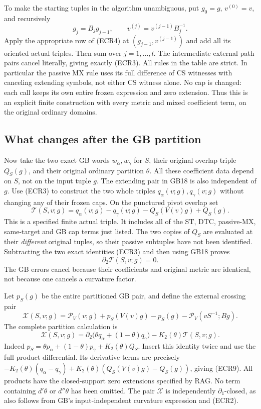 To make the starting tuples in the algorithm unambiguous, put
$g_0=g$, $v^{(0)}=v$, and recursively
\[
        g_j=B_jg_{j-1},\qquad
        v^{(j)}=v^{(j-1)}B_j^{-1}.
 \tag{ECR6}
\]
Apply the appropriate row of (ECR4) at $(g_{j-1},v^{(j-1)})$
and add all its oriented actual triples.  Then sum over
$j=1,\ldots,l$.  The intermediate external path pairs cancel
literally, giving exactly (ECR3).  All rules in the table are
strict.  In particular the passive MX rule uses its full
difference of CS witnesses with canceling extending symbols,
not either CS witness alone.  No cap is changed: each call keeps
its own entire frozen expression and zero extension.  Thus this
is an explicit finite construction with every metric and mixed
coefficient term, on the original ordinary domains.

\subsection{What changes after the GB partition}

Now take the two exact GB words $w_\alpha,w_\gamma$ for $S$,
their original overlap triple $Q_S(g)$, and their original
ordinary partition $\theta$.  All these coefficient data depend
on $S$, not on the input tuple $g$.  The extending pair in GB18
is also independent of $g$.  Use (ECR3) to construct the two
whole triples $q_\alpha(v;g),q_\gamma(v;g)$ without changing
any of their frozen caps.  On the punctured pivot overlap set
\[
 \mathcal T(S,v;g)=q_\alpha(v;g)-q_\gamma(v;g)
                        -Q_S(V(v)g)+Q_S(g).
 \tag{ECR7}
\]
This is a specified finite actual triple.  It includes all of
the ST, DTC, passive-MX, same-target and GB cap terms just listed.
The two copies of $Q_S$ are evaluated at their \emph{different}
original tuples, so their passive subtuples have not been
identified.  Subtracting the two exact identities (ECR3) and
then using GB18 proves
\[
                       \partial_2\mathcal T(S,v;g)=0.
 \tag{ECR8}
\]
The GB errors cancel because their coefficients and original
metric are identical, not because one cancels a curvature factor.

Let $p_S(g)$ be the entire partitioned GB pair, and define the
external crossing pair
\[
 \mathcal X(S,v;g)=\mathcal P_V(v;g)+p_S(V(v)g)
                      -p_S(g)-\mathcal P_V(vS^{-1};Bg).
\]
The complete partition calculation is
\[
 \boxed{\quad
 \mathcal X(S,v;g)
 =\partial_2\bigl(\theta q_\alpha+(1-\theta)q_\gamma\bigr)
                      -K_2(\theta)\mathcal T(S,v;g).
 \quad}
 \tag{ECR9}
\]
Indeed $p_S=\theta p_\alpha+(1-\theta)p_\gamma+K_2(\theta)Q_S$.
Insert this identity twice and use the full product differential.
Its derivative terms are precisely
$-K_2(\theta)(q_\alpha-q_\gamma)
 +K_2(\theta)(Q_S(V(v)g)-Q_S(g))$, giving (ECR9).
All products have the closed-support zero extensions specified
by RAG.  No term containing $d'\theta$ or $d''\theta$ has
been omitted.  The pair $\mathcal X$ is independently
$\partial_1$-closed, as also follows from GB's input-independent
curvature expression and (ECR2).

